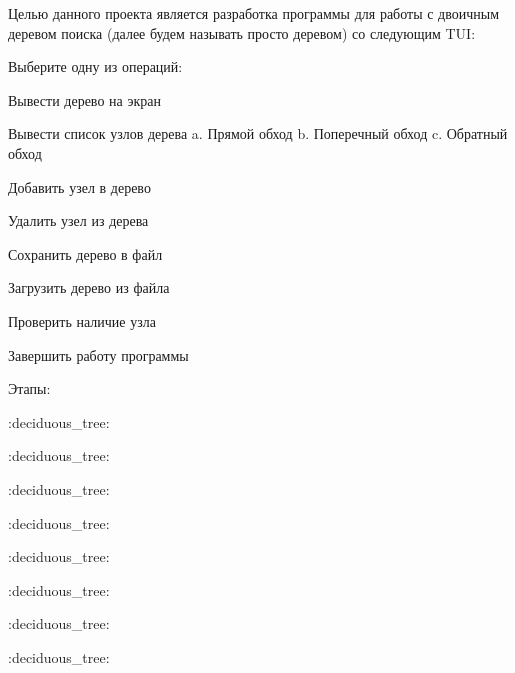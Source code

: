 \href{https://travis-ci.org/kit10000000/BSTTree}{\tt }

Целью данного проекта является разработка программы для работы с двоичным деревом поиска (далее будем называть просто деревом) со следующим T\+UI\+:

Выберите одну из операций\+:
\begin{DoxyEnumerate}
\item Вывести дерево на экран
\item Вывести список узлов дерева a. Прямой обход b. Поперечный обход c. Обратный обход
\item Добавить узел в дерево
\item Удалить узел из дерева
\item Сохранить дерево в файл
\item Загрузить дерево из файла
\item Проверить наличие узла
\item Завершить работу программы
\end{DoxyEnumerate}

Этапы\+:
\begin{DoxyEnumerate}
\item \+:deciduous\+\_\+tree\+:
\item \+:deciduous\+\_\+tree\+:
\item \+:deciduous\+\_\+tree\+:
\item \+:deciduous\+\_\+tree\+:
\item \+:deciduous\+\_\+tree\+:
\item \+:deciduous\+\_\+tree\+:
\item \+:deciduous\+\_\+tree\+:
\item \+:deciduous\+\_\+tree\+:
\end{DoxyEnumerate}

